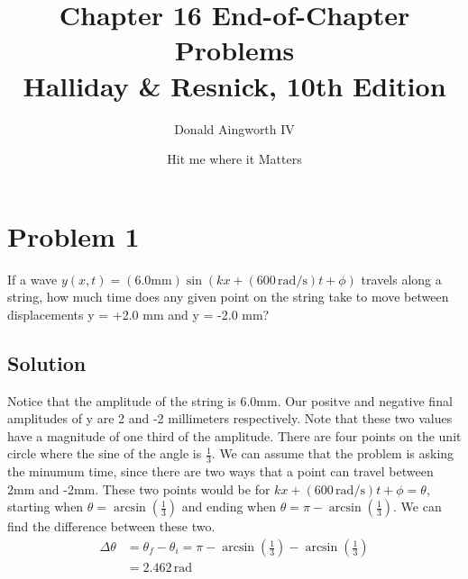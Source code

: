 \documentclass[12pt]{article}
\title{
    Chapter 16 End-of-Chapter Problems
    \\ \small
    Halliday \& Resnick, 10th Edition
}
\author{Donald Aingworth IV}
\date{\small Hit me where it Matters}
\begin{document}

    \maketitle

    \pagebreak
    \section{Problem 1}
        If a wave $y(x, t) = (6.0 \unit{\milli\meter}) \sin(kx + (600\,\unit{\radian/\second})t + \phi)$ travels along a string, how much time does any given point on the string take to move between displacements y = +2.0 mm and y = -2.0 mm?

        \subsection{Solution}
            Notice that the amplitude of the string is 6.0\unit{\milli\meter}. 
            Our positve and negative final amplitudes of y are 2 and -2 millimeters respectively.
            Note that these two values have a magnitude of one third of the amplitude.
            There are four points on the unit circle where the sine of the angle is $\frac{1}{3}$. 
            We can assume that the problem is asking the minumum time, since there are two ways that a point can travel between 2mm and -2mm.
            These two points would be for $kx + (600\,\unit{\radian/\second})t + \phi = \theta$, starting when $\theta = \arcsin\left( \frac{1}{3} \right)$ and ending when $\theta = \pi - \arcsin\left( \frac{1}{3} \right)$. 
            We can find the difference between these two. 
            \begin{align}
                \Delta \theta   &=  \theta_f - \theta_i
                    =   \pi - \arcsin\left( \frac{1}{3} \right) - \arcsin\left( \frac{1}{3} \right)\\
                    &=  2.462\,\unit{\radian}
            \end{align}
\end{document}
